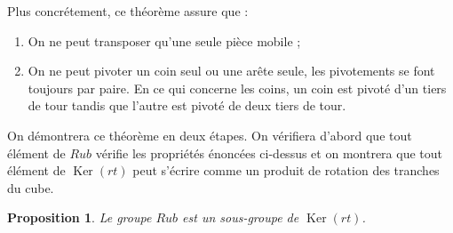 \documentclass[french]{report}
\newtheorem{prop}{Proposition}[section]
\begin{document}
Plus concrétement, ce théorème assure que :

\begin{enumerate}
  \item On ne peut transposer qu'une seule pièce mobile ;
  \item On ne peut pivoter un coin seul ou une arête seule, les pivotements se font toujours par paire. En ce qui concerne les coins, un coin est pivoté d'un tiers de tour tandis que l'autre est pivoté de deux tiers de tour.
\end{enumerate}

On démontrera ce théorème en deux étapes. On vérifiera d'abord que tout élément de $Rub$ vérifie les propriétés énoncées ci-dessus et on montrera que tout élément de $\operatorname{Ker}(rt)$ peut s'écrire comme un produit de rotation des tranches du cube.

\begin{prop}
  Le groupe $Rub$ est un sous-groupe de $\operatorname{Ker}(rt)$.
\end{prop}
\end{document}
